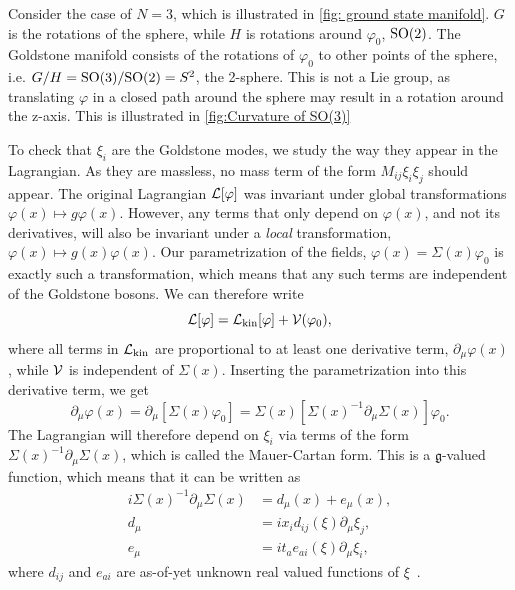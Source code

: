 Consider the case of $N = 3$, which is illustrated in \autoref{fig: ground state manifold}.
$G$ is the rotations of the sphere, while $H$ is rotations around $\varphi_0$, $\text{SO}(2)$.
The Goldstone manifold consists of the rotations of $\varphi_0$ to other points of the sphere, i.e. $G/H = \text{SO}(3)/\text{SO}(2) = S^2$, the 2-sphere.
This is not a Lie group, as translating $\varphi$ in a closed path around the sphere may result in a rotation around the z-axis.
This is illustrated in \autoref{fig:Curvature of SO(3)}


To check that $\xi_i$ are the Goldstone modes, we study the way they appear in the Lagrangian.
As they are massless, no mass term of the form $M_{ij} \xi_i \xi_j$ should appear.
The original Lagrangian $\mathcal{L}[\varphi]$ was invariant under global transformations $\varphi(x) \mapsto g \varphi(x)$.
However, any terms that only depend on $\varphi(x)$, and not its derivatives, will also be invariant under a \emph{local} transformation, $\varphi(x) \mapsto g(x)\varphi(x)$.
Our parametrization of the fields, $\varphi(x) = \Sigma(x)\varphi_0$ is exactly such a transformation, which means that any such terms are independent of the Goldstone bosons.
We can therefore write
%
\begin{equation}
    \mathcal{L}[\varphi] = \mathcal{L}_{\mathrm{kin}}[\varphi] + \mathcal{V}(\varphi_0),
\end{equation}
%
where all terms in $\mathcal{L}_{\mathrm{kin}}$ are proportional to at least one derivative term, $\partial_\mu \varphi(x)$, while $\mathcal{V}$ is independent of $\Sigma(x)$.
Inserting the parametrization into this derivative term, we get
%
\begin{equation}
    \partial_\mu \varphi(x) = \partial_\mu [\Sigma(x) \varphi_0]
    = \Sigma(x) [\Sigma(x)^{-1} \partial_{\mu} \Sigma(x)] \varphi_0.
\end{equation}
%
The Lagrangian will therefore depend on $\xi_i$ via terms of the form $\Sigma(x)^{-1}\partial_\mu \Sigma(x)$, which is called the Mauer-Cartan form.
This is a $\mathfrak g$-valued function, which means that it can be written as
%
\begin{align}
    \label{Mauer-Cartan form}
    i\Sigma(x)^{-1}\partial_\mu \Sigma(x) & 
    = d_{\mu}(x) + e_{\mu}(x), \\
    d_{\mu} & = i x_i d_{ij}(\xi) \partial_\mu \xi_j, \\
    e_{\mu} & = i t_a e_{ai}(\xi)\partial_\mu \xi_i,
\end{align}
%
where $d_{ij}$ and $e_{ai}$ are as-of-yet unknown real valued functions of $\xi$~\autocite{watanabeEffectiveLagrangianNonrelativistic2014,weinbergQuantumTheoryFields1996}.




